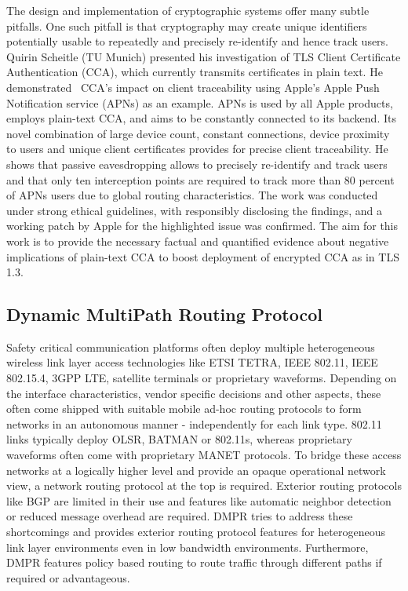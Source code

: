 The design and implementation of cryptographic systems offer many subtle
pitfalls. One such pitfall is that cryptography may create unique identifiers
potentially usable to repeatedly and precisely re-identify and hence track
users. Quirin Scheitle (TU Munich) presented his investigation of TLS Client
Certificate Authentication (CCA), which currently transmits certificates in
plain text. He demonstrated~\cite{qscheitle:tma:2017} CCA’s impact on client
traceability using Apple’s Apple Push Notification service (APNs) as an
example. APNs is used by all Apple products, employs plain-text CCA, and aims
to be constantly connected to its backend. Its novel combination of large
device count, constant connections, device proximity to users and unique
client certificates provides for precise client traceability. He shows that
passive eavesdropping allows to precisely re-identify and track users and that
only ten interception points are required to track more than 80 percent of
APNs users due to global routing characteristics. The work was conducted under
strong ethical guidelines, with responsibly disclosing the findings, and a
working patch by Apple for the highlighted issue was confirmed. The aim for
this work is to provide the necessary factual and quantified evidence about
negative implications of plain-text CCA to boost deployment of encrypted CCA
as in TLS 1.3.


\subsection{Dynamic MultiPath Routing Protocol}

Safety critical communication platforms often deploy multiple heterogeneous
wireless link layer access technologies like ETSI TETRA, IEEE 802.11, IEEE
802.15.4, 3GPP LTE, satellite terminals or proprietary waveforms.  Depending
on the interface characteristics, vendor specific decisions and other aspects,
these often come shipped with suitable mobile ad-hoc routing protocols to form
networks in an autonomous manner - independently for each link type. 802.11
links typically deploy OLSR, BATMAN or 802.11s, whereas proprietary waveforms
often come with proprietary MANET protocols.  To bridge these access networks
at a logically higher level and provide an opaque operational network view, a
network routing protocol at the top is required. Exterior routing protocols
like BGP are limited in their use and features like automatic neighbor
detection or reduced message overhead are required. \ac{DMPR} tries to address
these shortcomings and provides exterior routing protocol features for
heterogeneous link layer environments even in low bandwidth environments.
Furthermore, \ac{DMPR} features policy based routing to route traffic through
different paths if required or advantageous.

